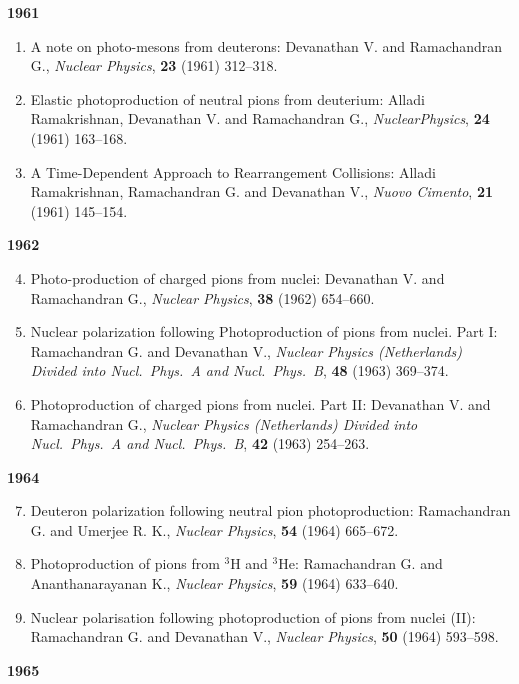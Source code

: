 \noindent
\textbf{1961}
\begin{enumerate}
\item A note on photo-mesons from deuterons: Devanathan V. and Ramachandran G., \textit{Nuclear Physics}, {\bf 23} (1961) 312--318.
\item Elastic photoproduction of neutral pions from deuterium: Alladi Ramakrishnan, Devanathan V. and Ramachandran G., \textit{Nuclear\break Physics}, {\bf 24} (1961) 163--168.
\item A Time-Dependent Approach to Rearrangement Collisions: Alladi Ramakrishnan, Ramachandran G. and Devanathan V., \textit{Nuovo Cimento}, {\bf 21} (1961) 145--154.
\end{enumerate}
\noindent
\textbf{1962}
\begin{enumerate}
\setcounter{enumi}{3}
\item Photo-production of charged pions from nuclei: Devanathan V. and Ramachandran G., \textit{Nuclear Physics}, {\bf 38} (1962) 654--660.

\item Nuclear polarization following Photoproduction of pions from nuclei. Part I: Ramachandran G. and Devanathan V., \textit{Nuclear Physics (Netherlands) Divided into Nucl.\ Phys.\ A and Nucl.\ Phys.\ B}, {\bf 48} (1963) 369--374.

\item Photoproduction of charged pions from nuclei. Part II: Devanathan V. and Ramachandran G., \textit{Nuclear Physics (Netherlands) Divided into Nucl.\  Phys.\ A and Nucl.\ Phys.\ B}, {\bf 42} (1963) 254--263.
\end{enumerate}
\noindent
\textbf{1964}
\begin{enumerate}
\setcounter{enumi}{6}
\item Deuteron polarization following neutral pion photoproduction: Ramachandran G. and Umerjee R. K., \textit{Nuclear Physics}, {\bf 54} (1964) 665--672.
\item Photoproduction of pions from $^{3}$H and $^{3}$He: Ramachandran G. and Ananthanarayanan K., \textit{Nuclear Physics}, {\bf 59} (1964) 633--640.
\item Nuclear polarisation following photoproduction of pions from nuclei (II): Ramachandran G. and Devanathan V., \textit{Nuclear Physics}, {\bf 50} (1964) 593--598.
\end{enumerate}
\textbf{1965}
